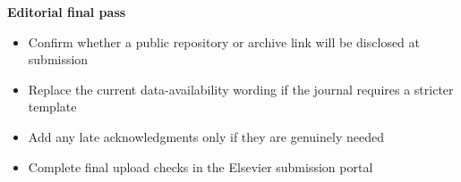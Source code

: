 \documentclass[11pt]{article}
\begin{document}
\textbf{Editorial final pass}
\begin{itemize}[leftmargin=1.8em,itemsep=2pt,topsep=2pt]
\item [todo] Confirm whether a public repository or archive link will be disclosed at submission
\item [todo] Replace the current data-availability wording if the journal requires a stricter template
\item [todo] Add any late acknowledgments only if they are genuinely needed
\item [todo] Complete final upload checks in the Elsevier submission portal
\end{itemize}
\end{document}
